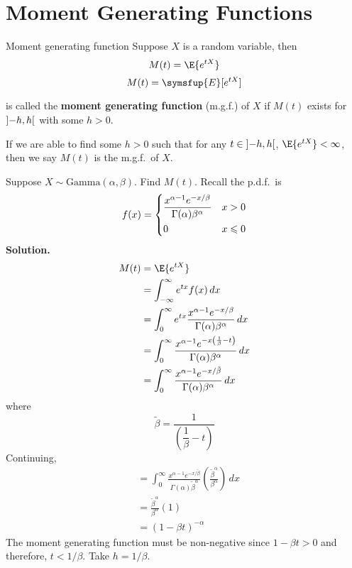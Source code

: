 \section{Moment Generating Functions}
\begin{Definition}{Moment generating function}{}
    Suppose $ X $ is a random variable, then
    \[ M(t)=\E{e^{tX}} \]
    \[ M(t)=\symsfup{E}[e^{tX}] \]

    is called the \textbf{moment generating function} (m.g.f.) of $ X $
    if $ M(t) $ exists for $ \interval[open]{-h}{h} $ with some $ h>0 $.
\end{Definition}
\begin{Remark}{}{}
    If we are able to find some $ h>0 $ such that for any
    $ t\in\interval[open]{-h}{h} $,
    $ \E{e^{tX}}<\infty $, then we
    say $ M(t) $ is the m.g.f.\ of $ X $.
\end{Remark}

\begin{Example}{}{}
    Suppose $ X \sim \text{Gamma}(\alpha,\beta) $. Find $ M(t) $.
    Recall the p.d.f.\ is
    \[ f(x)=\begin{dcases}
            \frac{x^{\alpha-1}e^{-x/\beta}}{\Gamma(\alpha)\beta^\alpha} & x>0          \\
            0                                                           & x\leqslant 0
        \end{dcases}
    \]
    \textbf{Solution.}
    \begin{align*}
        M(t)
         & =\E{e^{tX}}                                                                                     \\
         & =\int_{-\infty}^{\infty} e^{tx}f(x)\, d{x}                                                      \\
         & =\int_{0}^{\infty} e^{tx} \frac{x^{\alpha-1}e^{-x/\beta}}{
        \Gamma(\alpha)\beta^\alpha
        } \, d{x}                                                                                          \\
         & =\int_{0}^{\infty} \frac{x^{\alpha-1}e^{-x\left( \frac{1}{\beta} -t \right)}}{
        \Gamma(\alpha)\beta^\alpha
        } \, d{x}                                                                                          \\
         & = \int_{0}^{\infty} \frac{x^{\alpha-1}e^{-x/\tilde{\beta}}}{\Gamma(\alpha)\beta^\alpha} \, d{x}
    \end{align*}
    where
    \[ \tilde{\beta}=\dfrac{1}{\left(\dfrac{1}{\beta}-t\right)}  \]
    Continuing,
    \begin{align*}
         & =\int_{0}^{\infty} \frac{x^{\alpha-1}e^{-x/\tilde{\beta}}}{\Gamma(\alpha)
        \tilde{\beta}^\alpha} \left( \frac{\tilde{\beta}^\alpha}{\beta^\alpha} \right)  \, d{x} \\
         & =\frac{\tilde{\beta}^\alpha}{\beta^\alpha}(1)                                        \\
         & =\left( 1-\beta t \right)^{-\alpha}
    \end{align*}
    The moment generating function must be non-negative since
    $ 1-\beta t>0 $ and therefore, $ t<1/\beta $. Take $ h=1/\beta $.
\end{Example}

